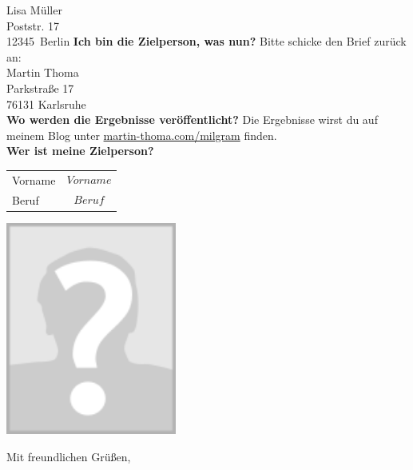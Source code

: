\documentclass[a4paper, 12pt, KOMAold, sections]{scrlttr2}
\newcommand{\Empfaenger}{Lisa Müller} %
\newcommand{\EStrasse}{Poststr. 17}   %
\newcommand{\EPLZ}{12345}             %
\newcommand{\EOrt}{Berlin}            %
\newcommand{\section}[1]{\noindent\textbf{#1}\newline}
\begin{document}
\begin{letter}{\Empfaenger \\ \EStrasse \\ \EPLZ~\EOrt}
    \section{Ich bin die Zielperson, was nun?}
    Bitte schicke den Brief zurück an:\\

    \noindent Martin Thoma\\
    Parkstraße 17\\
    76131 Karlsruhe\\

    \section{Wo werden die Ergebnisse veröffentlicht?}
    Die Ergebnisse wirst du auf meinem Blog unter \href{http://martin-thoma.com/milgram}{martin-thoma.com/milgram}
    finden.\\

    \section{Wer ist meine Zielperson?}
    \begin{tabular}{ll}
    Vorname & $$Vorname$$\\
    Beruf   & $$Beruf$$\\
    \end{tabular}


    {\centering
    \includegraphics*[width=\linewidth,height=7cm,keepaspectratio]{Image_of_none.png}
    }

    \closing{Mit freundlichen Grüßen,}
    \end{letter}
\end{document}
